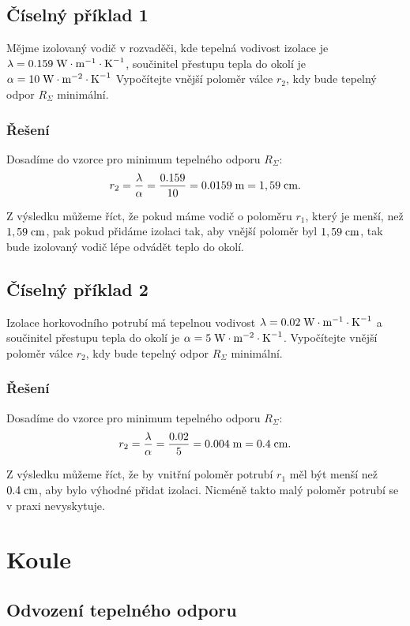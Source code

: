 \documentclass{article}
\begin{document}
\subsection{Číselný příklad 1}
Mějme izolovaný vodič v rozvaděči, kde tepelná vodivost izolace je $\lambda = 0.159 \; \textrm{W} \cdot \textrm{m}^{-1} \cdot \textrm{K}^{-1}$, součinitel přestupu tepla do okolí je $\alpha = 10 \; \textrm{W} \cdot \textrm{m}^{-2} \cdot \textrm{K}^{-1}$ Vypočítejte vnější poloměr válce $r_2$, kdy bude tepelný odpor $R_\Sigma$ minimální.

\subsubsection{Řešení}
Dosadíme do vzorce pro minimum tepelného odporu $R_\Sigma$:
$$
    r_2 = \frac{\lambda}{\alpha} = \frac{0.159}{10} = 0.0159 \; \textrm{m} = 1,59 \; \textrm{cm}.
$$

Z výsledku můžeme říct, že pokud máme vodič o poloměru $r_1$, který je menší, než $1,59 \; \textrm{cm}$, pak pokud přidáme izolaci tak, aby vnější poloměr byl $1,59 \; \textrm{cm}$, tak bude izolovaný vodič lépe odvádět teplo do okolí.


\subsection{Číselný příklad 2}
Izolace horkovodního potrubí má tepelnou vodivost $\lambda = 0.02 \; \textrm{W} \cdot \textrm{m}^{-1} \cdot \textrm{K}^{-1}$ a součinitel přestupu tepla do okolí je $\alpha = 5 \; \textrm{W} \cdot \textrm{m}^{-2} \cdot \textrm{K}^{-1}$. Vypočítejte vnější poloměr válce $r_2$, kdy bude tepelný odpor $R_\Sigma$ minimální.

\subsubsection{Řešení}
Dosadíme do vzorce pro minimum tepelného odporu $R_\Sigma$:
$$
    r_2 = \frac{\lambda}{\alpha} = \frac{0.02}{5} = 0.004 \; \textrm{m} = 0.4 \; \textrm{cm}.
$$

Z výsledku můžeme říct, že by vnitřní poloměr potrubí $r_1$ měl být menší než $0.4 \; \textrm{cm}$, aby bylo výhodné přidat izolaci. Nicméně takto malý poloměr potrubí se v praxi nevyskytuje.

\newpage



\section{ Koule \spicy \spicy \spicy}


\subsection{Odvození tepelného odporu}
\end{document}
